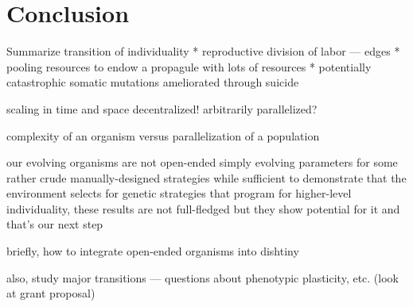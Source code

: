 \section{Conclusion}

Summarize transition of individuality
  * reproductive division of labor --- edges
  * pooling resources to endow a propagule with lots of resources
  * potentially catastrophic somatic mutations ameliorated through suicide

scaling in time and space
decentralized! arbitrarily parallelized?

complexity of an organism versus parallelization of a population


our evolving organisms are not open-ended
simply evolving parameters for some rather crude manually-designed strategies
while sufficient to demonstrate that the environment selects for genetic strategies that program for higher-level individuality, these results are not full-fledged
but they show potential for it and that's our next step

briefly, how to integrate open-ended organisms into dishtiny

also, study major transitions --- questions about phenotypic plasticity, etc. (look at grant proposal)
